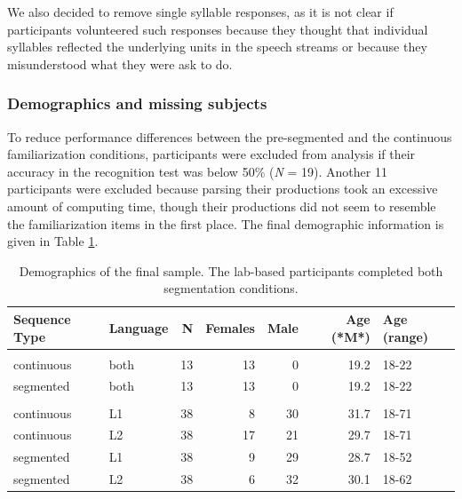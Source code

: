 \documentclass[
]{article}
\begin{document}
We also decided to remove single syllable responses, as it is not clear
if participants volunteered such responses because they thought that
individual syllables reflected the underlying units in the speech
streams or because they misunderstood what they were ask to do.

\hypertarget{demographics-and-missing-subjects}{%
\subsubsection{Demographics and missing
subjects}\label{demographics-and-missing-subjects}}

To reduce performance differences between the pre-segmented and the
continuous familiarization conditions, participants were excluded from
analysis if their accuracy in the recognition test was below 50\%
(\emph{N} = 19). Another 11 participants were excluded because parsing
their productions took an excessive amount of computing time, though
their productions did not seem to resemble the familiarization items in
the first place. The final demographic information is given in Table
\ref{tab:recall-final-demographics-print}.

\begin{table}

\caption{\label{tab:recall-final-demographics-print}Demographics of the final sample. The lab-based participants completed both segmentation conditions.}
\centering
\begin{tabular}[t]{llrrrrl}
\toprule
Sequence Type & Language & N & Females & Male & Age (*M*) & Age (range)\\
\midrule
\addlinespace[0.3em]
\multicolumn{7}{l}{\textbf{Lab-based}}\\
\hspace{1em}continuous & both & 13 & 13 & 0 & 19.2 & 18-22\\
\hspace{1em}segmented & both & 13 & 13 & 0 & 19.2 & 18-22\\
\addlinespace[0.3em]
\multicolumn{7}{l}{\textbf{Online}}\\
\hspace{1em}continuous & L1 & 38 & 8 & 30 & 31.7 & 18-71\\
\hspace{1em}continuous & L2 & 38 & 17 & 21 & 29.7 & 18-71\\
\hspace{1em}segmented & L1 & 38 & 9 & 29 & 28.7 & 18-52\\
\hspace{1em}segmented & L2 & 38 & 6 & 32 & 30.1 & 18-62\\
\bottomrule
\end{tabular}
\end{table}
\end{document}
